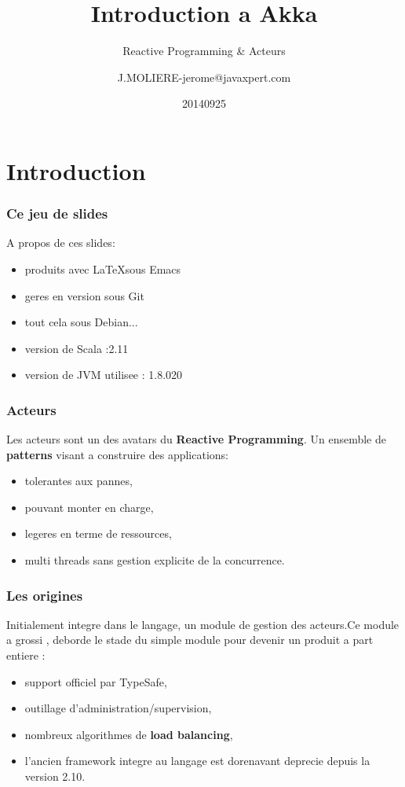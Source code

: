 \documentclass[xcolor=dvipsnames]{beamer}
\title[]{Introduction a Akka}
\subtitle[]{Reactive  Programming \& Acteurs}
\author[]{J.MOLIERE-jerome@javaxpert.com}
\institute[]{Zenika}
\date{20140925}
\begin{document}
\lstset{language=Scala}
\begin{frame}
\titlepage
\end{frame}
\section{Introduction}
\begin{frame}
  \frametitle{Ce jeu de slides}
  A propos de ces slides:
  \begin{itemize}
  \item produits avec \LaTeX sous Emacs
  \item geres en version sous Git
  \item tout cela sous Debian...
  \item version de Scala :2.11
  \item version de JVM utilisee : 1.8.020
  \end{itemize}
\end{frame}

\begin{frame}
  \frametitle{Acteurs}
   Les acteurs sont un des avatars du \textbf{Reactive Programming}.
   Un ensemble de \textbf{patterns} visant a construire des applications:
   \begin{itemize}
   \item tolerantes aux pannes,
   \item pouvant monter en charge,
   \item legeres en terme de ressources,
   \item multi threads sans gestion explicite de la concurrence.
   \end{itemize}
\end{frame}

\begin{frame}
  \frametitle{Les origines}
  Initialement integre dans le langage, un module de gestion des acteurs.Ce module a grossi , deborde le stade du simple module pour devenir un produit a part entiere :
  \begin{exampleblock}{}
  \begin{itemize}
   \item support officiel par TypeSafe,
   \item outillage d'administration/supervision,
   \item nombreux algorithmes de \textbf{load balancing},
   \item l'ancien framework integre au langage est dorenavant deprecie depuis la version 2.10.
  \end{itemize}
  \end{exampleblock}
\end{frame}
\end{document}
